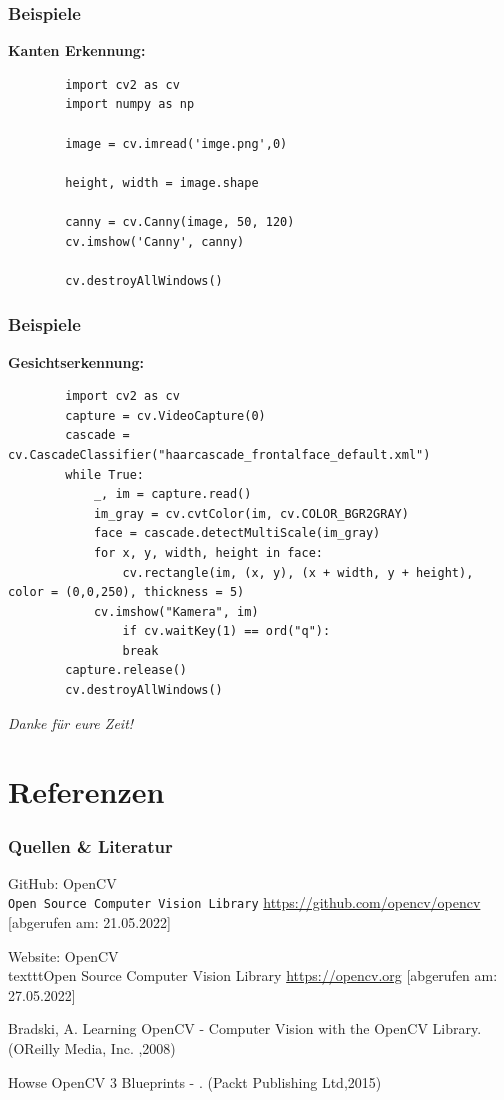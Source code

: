 \documentclass{beamer}
\begin{document}
\begin{frame} [fragile]
\frametitle{Beispiele}
	\textbf{Kanten Erkennung:}\\
	\lstset{style=myStyle}
	\begin{lstlisting}
		import cv2 as cv
		import numpy as np
		
		image = cv.imread('imge.png',0)
		
		height, width = image.shape
		
		canny = cv.Canny(image, 50, 120)
		cv.imshow('Canny', canny)
		
		cv.destroyAllWindows()
	\end{lstlisting}
	\cite{Howse2015}
\end{frame}

\begin{frame} [fragile]
	\frametitle{Beispiele}
	\textbf{Gesichtserkennung:}\\
	\lstset{style=myStyle}
	\begin{lstlisting}
		import cv2 as cv
		capture = cv.VideoCapture(0)
		cascade = cv.CascadeClassifier("haarcascade_frontalface_default.xml")
		while True:
			_, im = capture.read()
			im_gray = cv.cvtColor(im, cv.COLOR_BGR2GRAY)
			face = cascade.detectMultiScale(im_gray)
			for x, y, width, height in face:
				cv.rectangle(im, (x, y), (x + width, y + height), color = (0,0,250), thickness = 5)
			cv.imshow("Kamera", im)
				if cv.waitKey(1) == ord("q"):
				break
		capture.release()
		cv.destroyAllWindows()
	\end{lstlisting}
	\cite{Howse2015}
\end{frame}

\begin{frame}
	\centering \Large
	\emph{Danke für eure Zeit!}
\end{frame}

\section[Quellen]{Referenzen}

\begin{frame}\frametitle{Quellen \& Literatur}
	\begin{thebibliography}{9}
		GitHub: OpenCV
		\\\texttt{Open Source Computer Vision Library}
		\url{https://github.com/opencv/opencv}
		[abgerufen am: 21.05.2022]
		
		Website: OpenCV
		\\texttt{Open Source Computer Vision Library}
		\url{https://opencv.org}
		[abgerufen am: 27.05.2022]
		
		Bradski, A. Learning OpenCV - Computer Vision with the OpenCV Library. (OReilly Media, Inc. ,2008)
		
		Howse OpenCV 3 Blueprints - . (Packt Publishing Ltd,2015)
	\end{thebibliography}
\end{frame}
\end{document}
